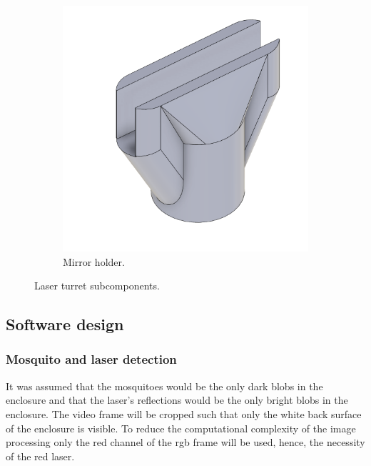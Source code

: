 \begin{figure}[!htb]
\begin{subfigure}{0.3\textwidth}
    \includegraphics[width=0.7\linewidth]{figures/hardware_design/mirror_holder.png}
    \caption{Mirror holder.}
  \end{subfigure}
  \caption{Laser turret subcomponents.}
  \label{fig:turret_subcomponents}
\end{figure}



\FloatBarrier
\subsection{Software design}
\subsubsection{Mosquito and laser detection} \label{subsubsec:mosquito_and_laser_detection}
It was assumed that the mosquitoes would be the only dark blobs in the enclosure and that the laser's reflections would be the only bright blobs in the enclosure. The video frame will be cropped such that only the white back surface of the enclosure is visible. To reduce the computational complexity of the image processing only the red channel of the \gls{rgb} frame will be used, hence, the necessity of the red laser.

